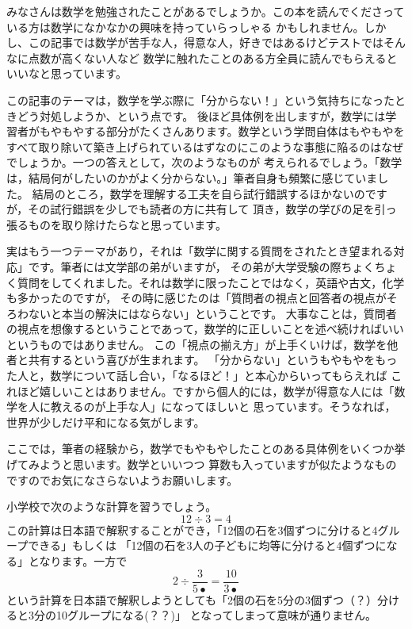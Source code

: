 \documentclass[./main]{subfiles}
\begin{document}


みなさんは数学を勉強されたことがあるでしょうか。この本を読んでくださっている方は数学になかなかの興味を持っていらっしゃる
かもしれません。しかし、この記事では数学が苦手な人，得意な人，好きではあるけどテストではそんなに点数が高くない人など
数学に触れたことのある方全員に読んでもらえるといいなと思っています。

この記事のテーマは，数学を学ぶ際に「分からない！」という気持ちになったときどう対処しようか、という点です。
後ほど具体例を出しますが，数学には学習者がもやもやする部分がたくさんあります。数学という学問自体はもやもやを
すべて取り除いて築き上げられているはずなのにこのような事態に陥るのはなぜでしょうか。一つの答えとして，次のようなものが
考えられるでしょう。「数学は，結局何がしたいのかがよく分からない。」筆者自身も頻繁に感じていました。
結局のところ，数学を理解する工夫を自ら試行錯誤するほかないのですが，その試行錯誤を少しでも読者の方に共有して
頂き，数学の学びの足を引っ張るものを取り除けたらなと思っています。

実はもう一つテーマがあり，それは「数学に関する質問をされたとき望まれる対応」です。筆者には文学部の弟がいますが，
その弟が大学受験の際ちょくちょく質問をしてくれました。それは数学に限ったことではなく，英語や古文，化学も多かったのですが，
その時に感じたのは「質問者の視点と回答者の視点がそろわないと本当の解決にはならない」ということです。
大事なことは，質問者の視点を想像するということであって，数学的に正しいことを述べ続ければいいというものではありません。
この「視点の揃え方」が上手くいけば，数学を他者と共有するという喜びが生まれます。
「分からない」というもやもやをもった人と，数学について話し合い，「なるほど！」と本心からいってもらえれば
これほど嬉しいことはありません。ですから個人的には，数学が得意な人には「数学を人に教えるのが上手な人」になってほしいと
思っています。そうなれば，世界が少しだけ平和になる気がします。


ここでは，筆者の経験から，数学でもやもやしたことのある具体例をいくつか挙げてみようと思います。数学といいつつ
算数も入っていますが似たようなものですのでお気になさらないようお願いします。


小学校で次のような計算を習うでしょう。
\[
12 \div 3 = 4
\]
この計算は日本語で解釈することができ，「12個の石を3個ずつに分けると4グループできる」もしくは
「12個の石を3人の子どもに均等に分けると4個ずつになる」となります。一方で
\[
2 \div \frac{3}{5•} = \frac{10}{3•}
\]
という計算を日本語で解釈しようとしても「2個の石を5分の3個ずつ（？）分けると3分の10グループになる(？？)」
となってしまって意味が通りません。
\end{document}
